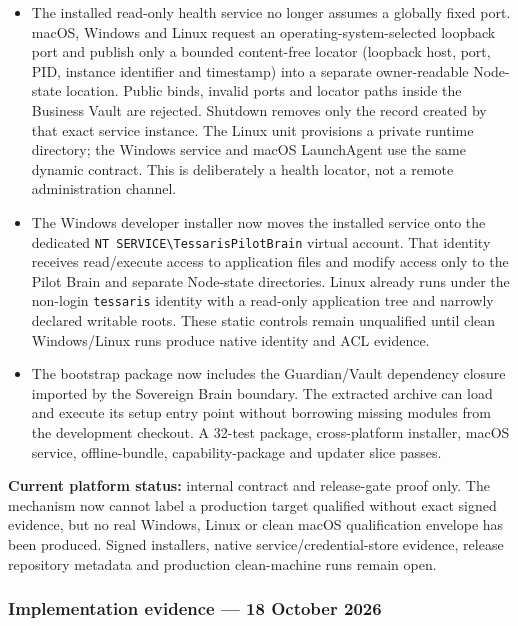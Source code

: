 \documentclass[11pt]{article}
\newcommand{\code}[1]{\texttt{#1}}
\begin{document}
\begin{itemize}
  \item The installed read-only health service no longer assumes a globally fixed port. macOS, Windows and Linux request an operating-system-selected loopback port and publish only a bounded content-free locator (loopback host, port, PID, instance identifier and timestamp) into a separate owner-readable Node-state location. Public binds, invalid ports and locator paths inside the Business Vault are rejected. Shutdown removes only the record created by that exact service instance. The Linux unit provisions a private runtime directory; the Windows service and macOS LaunchAgent use the same dynamic contract. This is deliberately a health locator, not a remote administration channel.
  \item The Windows developer installer now moves the installed service onto the dedicated \code{NT SERVICE\textbackslash TessarisPilotBrain} virtual account. That identity receives read/execute access to application files and modify access only to the Pilot Brain and separate Node-state directories. Linux already runs under the non-login \code{tessaris} identity with a read-only application tree and narrowly declared writable roots. These static controls remain unqualified until clean Windows/Linux runs produce native identity and ACL evidence.
  \item The bootstrap package now includes the Guardian/Vault dependency closure imported by the Sovereign Brain boundary. The extracted archive can load and execute its setup entry point without borrowing missing modules from the development checkout. A 32-test package, cross-platform installer, macOS service, offline-bundle, capability-package and updater slice passes.
\end{itemize}

\noindent\textbf{Current platform status:} internal contract and release-gate proof only. The mechanism now cannot label a production target qualified without exact signed evidence, but no real Windows, Linux or clean macOS qualification envelope has been produced. Signed installers, native service/credential-store evidence, release repository metadata and production clean-machine runs remain open.

\subsubsection*{Implementation evidence --- 18 October 2026}
\end{document}

